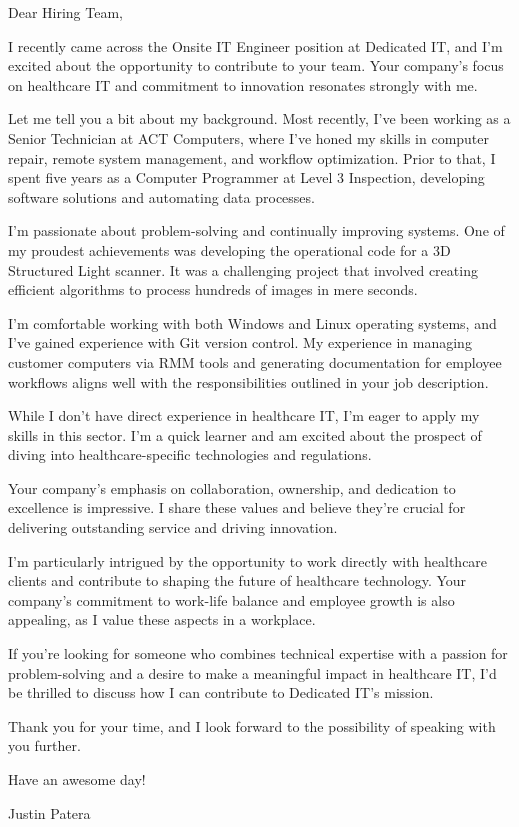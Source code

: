 
Dear Hiring Team,

\smallskip

I recently came across the Onsite IT Engineer position at Dedicated IT, and I'm excited about the opportunity to contribute to your team.
Your company's focus on healthcare IT and commitment to innovation resonates strongly with me.

\smallskip

Let me tell you a bit about my background.
Most recently, I've been working as a Senior Technician at ACT Computers, where I've honed my skills in computer repair, remote system management, and workflow optimization.
Prior to that, I spent five years as a Computer Programmer at Level 3 Inspection, developing software solutions and automating data processes.

\smallskip

I'm passionate about problem-solving and continually improving systems.
One of my proudest achievements was developing the operational code for a 3D Structured Light scanner.
It was a challenging project that involved creating efficient algorithms to process hundreds of images in mere seconds.

\smallskip

I'm comfortable working with both Windows and Linux operating systems, and I've gained experience with Git version control.
My experience in managing customer computers via RMM tools and generating documentation for employee workflows aligns well with the responsibilities outlined in your job description.

\smallskip

While I don't have direct experience in healthcare IT, I'm eager to apply my skills in this sector.
I'm a quick learner and am excited about the prospect of diving into healthcare-specific technologies and regulations.

\smallskip

Your company's emphasis on collaboration, ownership, and dedication to excellence is impressive.
I share these values and believe they're crucial for delivering outstanding service and driving innovation.

\smallskip

I'm particularly intrigued by the opportunity to work directly with healthcare clients and contribute to shaping the future of healthcare technology.
Your company's commitment to work-life balance and employee growth is also appealing, as I value these aspects in a workplace.

\smallskip

If you're looking for someone who combines technical expertise with a passion for problem-solving and a desire to make a meaningful impact in healthcare IT, I'd be thrilled to discuss how I can contribute to Dedicated IT's mission.

\smallskip

Thank you for your time, and I look forward to the possibility of speaking with you further.

\smallskip

Have an awesome day!

Justin Patera
